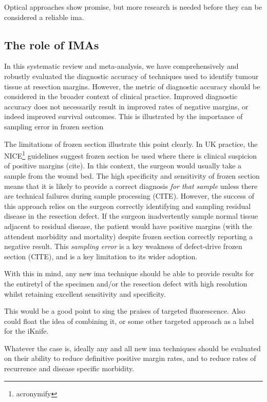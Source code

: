 Optical approaches show promise, but more research is needed before they can be considered a reliable \gls{ima}.

\subsection{The role of IMAs}
In this systematic review and meta-analysis, we have comprehensively and robustly evaluated the diagnostic accuracy of techniques used to identify tumour tissue at resection margins.
However, the metric of diagnostic accuracy should be considered in the broader context of clinical practice.
Improved diagnostic accuracy does not necessarily result in improved rates of negative margins, or indeed improved survival outcomes.
This is illustrated by the importance of sampling error in frozen section 

The limitations of frozen section illustrate this point clearly.
In UK practice, the NICE\footnote{acronymify} guidelines suggest frozen section be used where there is clinical suspicion of positive margins (cite).
In this context, the surgeon would usually take a sample from the wound bed.
The high specificity and sensitivity of frozen section means that it is likely to provide a correct diagnosis \textit{for that sample} unless there are technical failures during sample processing (CITE).
However, the success of this approach relies on the surgeon correctly identifying and sampling residual disease in the resection defect. 
If the surgeon inadvertently sample normal tissue adjacent to residual disease, the patient would have positive margins (with the attendent morbidity and mortality) despite frozen section correctly reporting a negative result.
This \textit{sampling error} is a key weakness of defect-drive frozen section (CITE), and is a key limitation to its wider adoption.

With this in mind, any new \gls{ima} technique should be able to provide results for the entiretyl of the specimen and/or the resection defect with high resolution whilst retaining excellent sensitivity and specificity.

This would be a good point to sing the praises of targeted fluorescence.
Also could float the idea of combining it, or some other targeted approach as a label for the iKnife.


Whatever the case is, ideally any and all new \gls{ima} techniques should be evaluated on their ability to reduce definitive positive margin rates, and to reduce rates of recurrence and disease specific morbidity.

